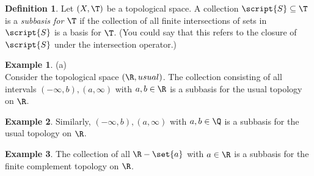 \documentclass[a5paper]{article}
\theoremstyle{definition}%
\newtheorem*{definition*}{Definition}
\newtheorem*{example*}{Example}
\numberwithin{exercise}{section}
\theoremstyle{remark}%
\begin{document}
\begin{highlight}
\begin{definition*}
Let $(X, \T)$ be a topological space. A collection $\script{S}\subseteq\T$ is a \emph{subbasis for $\T$} if the collection of all finite intersections of sets in $\script{S}$ is a basis for $\T$. (You could say that this refers to the closure of $\script{S}$ under the intersection operator.)
\end{definition*}
\end{highlight}

\begin{example*}(a)\\
Consider the topological space $(\R, usual)$. The collection consisting of all intervals $(-\infty, b), (a,\infty)$ with $a,b\in \R$ is a subbasis for the usual topology on $\R$. 
\end{example*}

\begin{example*}
Similarly, $(-\infty, b), (a,\infty)$ with $a,b\in \Q$ is a subbasis for the usual topology on $\R$. 
\end{example*}

\begin{example*}
The collection of all $\R-\set{a}$ with $a\in\R$ is a subbasis for the finite complement topology on $\R$. 
\end{example*}
\end{document}
